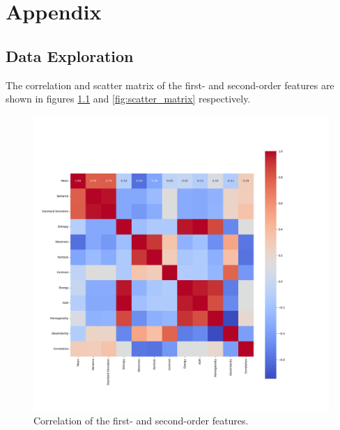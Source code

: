 \chapter{Appendix}
\label{cha:appendix}

\section{Data Exploration}
\label{sec:DataExploration}


The correlation and scatter matrix of the first- and second-order features are shown in figures \ref{fig:correlation} and \ref{fig:scatter_matrix} respectively.

\begin{figure}[H]
    \centering
    \includegraphics[width=.8\textwidth]{plots/correlation.png}
    \caption{Correlation of the first- and second-order features.}
    \label{fig:correlation}
\end{figure}

